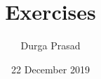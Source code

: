 \documentclass{beamer}
\title[Your Short Title]{Exercises}
\author{Durga Prasad}
\institute{}
\date{22 December 2019}
\begin{document}
\begin{frame}
  \titlepage
\end{frame}


\end{document}
